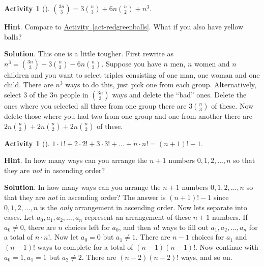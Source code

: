 \documentclass[10pt,]{book}
\theoremstyle{plain}
\theoremstyle{definition}
\theoremstyle{definition}
\theoremstyle{definition}
\newtheorem{activity}[project]{Activity}
\numberwithin{equation}{chapter}
\begin{document}
\begin{activity}[]\label{activity-97}
\hypertarget{p-723}{}%
\(\binom{3n}{3} = 3 \binom{n}{3} + 6n \binom{n}{2} + n^{3}\).%
\par\smallskip%
\noindent\textbf{Hint}.\hypertarget{hint-58}{}\quad%
\hypertarget{p-724}{}%
Compare to \hyperref[act-redgreenballs]{Activity~\ref{act-redgreenballs}}.  What if you also have yellow balls?%
\par\smallskip%
\noindent\textbf{Solution}.\hypertarget{solution-52}{}\quad%
\hypertarget{p-725}{}%
This one is a little tougher. First rewrite as \(n^{3} = \binom{3n}{3} - 3 \binom{n}{3} - 6n \binom{n}{2}\). Suppose you have \(n\) men, \(n\) women and \(n\) children and you want to select triples consisting of one man, one woman and one child. There are \(n^{3}\) ways to do this, just pick one from each group. Alternatively, select 3 of the \(3n\) people in \(\binom{3n}{3}\) ways and delete the ``bad'' ones. Delete the ones where you selected all three from one group \textemdash{} there are \(3 \binom{n}{3}\) of these. Now delete those where you had two from one group and one from another \textemdash{} there are \(2n \binom{n}{2} + 2n \binom{n}{2} + 2n \binom{n}{2}\) of these.%
\end{activity}
\begin{activity}[]\label{activity-98}
\hypertarget{p-726}{}%
\(1 \cdot 1! + 2 \cdot 2! + 3 \cdot 3! + \ldots + n \cdot n! = \left( n + 1 \right)! - 1\).%
\par\smallskip%
\noindent\textbf{Hint}.\hypertarget{hint-59}{}\quad%
\hypertarget{p-727}{}%
In how many ways can you arrange the \(n+1\) numbers \(0, 1, 2, \ldots, n\) so that they are \emph{not} in ascending order?%
\par\smallskip%
\noindent\textbf{Solution}.\hypertarget{solution-53}{}\quad%
\hypertarget{p-728}{}%
In how many ways can you arrange the \(n+1\) numbers \(0, 1, 2, \ldots, n\) so that they are \emph{not} in ascending order? The answer is \(\left( n + 1 \right)! - 1\) since \(0, 1, 2, \ldots, n\) is the \emph{only} arrangement in ascending order. Now lets separate into cases. Let \(a_{0},a_{1},a_{2},\ldots,a_{n}\) represent an arrangement of these \(n+1\) numbers. If \(a_{0} \neq 0\), there are \(n\) choices left for \(a_{0}\), and then \(n!\) ways to fill out \(a_{1},a_{2},\ldots,a_{n}\) for a total of \(n \cdot n!\). Now let \(a_{0} = 0\) but \(a_{1} \neq 1\). There are \(n - 1\) choices for \(a_{1}\) and \(\left(n - 1 \right)!\) ways to complete for a total of \(\left(n - 1 \right)\left(n - 1 \right)!\). Now continue with \(a_{0} = 1,a_{1} = 1\) but \(a_{2} \neq 2\). There are \(\left(n - 2 \right)\left(n - 2 \right)!\) ways, and so on.%
\end{activity}
\end{document}
